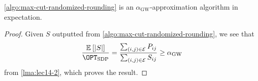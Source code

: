 \begin{theorem}
	\autoref{algo:max-cut-randomized-rounding} is an \(\alpha _\mathrm{GW}\)-approximation algorithm in expectation.
\end{theorem}
\begin{proof}
	Given \(S\) outputted from \autoref{algo:max-cut-randomized-rounding}, we see that
	\[
		\frac{\mathbb{E}_{}\left[\left\vert S \right\vert \right] }{\OPT_{\mathrm{SDP} }} = \frac{\sum_{(i, j)\in \mathcal{\MakeUppercase{e}} } P_{ij} }{\sum_{(i, j)\in \mathcal{\MakeUppercase{e}} } S_{ij} } \geq \alpha _{\mathrm{GW} }
	\]
	from \autoref{lma:lec14-2}, which proves the result.
\end{proof}
